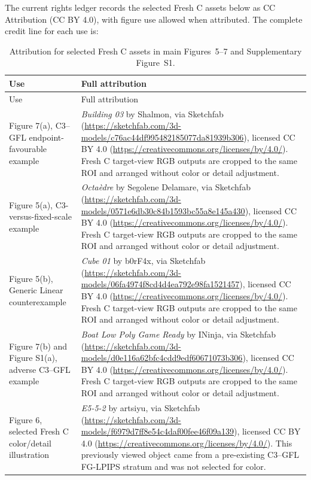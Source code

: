 \documentclass[11pt]{article}
\begin{document}
The current rights ledger records the selected Fresh C assets below as CC Attribution (CC BY 4.0), with figure use allowed when attributed. The complete credit line for each use is:
\begin{longtable}{p{4.3cm}p{10.9cm}}
\caption{Attribution for selected Fresh C assets in main Figures~5--7 and Supplementary Figure~S1.}\label{tab:supp-credits}\\
\toprule Use & Full attribution \\
\midrule\endfirsthead
\toprule Use & Full attribution \\
\midrule\endhead
Figure 7(a), C3--GFL endpoint-favourable example & \emph{Building 03} by Shalmon, via Sketchfab (\url{https://sketchfab.com/3d-models/c76ac44df995482185077da81939b306}), licensed CC BY 4.0 (\url{https://creativecommons.org/licenses/by/4.0/}). Fresh C target-view RGB outputs are cropped to the same ROI and arranged without color or detail adjustment. \\
Figure 5(a), C3-versus-fixed-scale example & \emph{Octaèdre} by Segolene Delamare, via Sketchfab (\url{https://sketchfab.com/3d-models/0571e6db30c84b1593bc55a8e145a430}), licensed CC BY 4.0 (\url{https://creativecommons.org/licenses/by/4.0/}). Fresh C target-view RGB outputs are cropped to the same ROI and arranged without color or detail adjustment. \\
Figure 5(b), Generic Linear counterexample & \emph{Cube 01} by b0rF4x, via Sketchfab (\url{https://sketchfab.com/3d-models/06fa4974f8cd4d4ea792e98fa1521457}), licensed CC BY 4.0 (\url{https://creativecommons.org/licenses/by/4.0/}). Fresh C target-view RGB outputs are cropped to the same ROI and arranged without color or detail adjustment. \\
Figure 7(b) and Figure S1(a), adverse C3--GFL example & \emph{Boat Low Poly Game Ready} by INinja, via Sketchfab (\url{https://sketchfab.com/3d-models/d0e116a62bfc4cdd9edf60671073b306}), licensed CC BY 4.0 (\url{https://creativecommons.org/licenses/by/4.0/}). Fresh C target-view RGB outputs are cropped to the same ROI and arranged without color or detail adjustment. \\
Figure 6, selected Fresh C color/detail illustration & \emph{E5-5-2} by artsiyu, via Sketchfab (\url{https://sketchfab.com/3d-models/f6979d7ff8e54c4daf00fee46f09a139}), licensed CC BY 4.0 (\url{https://creativecommons.org/licenses/by/4.0/}). This previously viewed object came from a pre-existing C3--GFL FG-LPIPS stratum and was not selected for color. \\
\bottomrule
\end{longtable}
\end{document}
